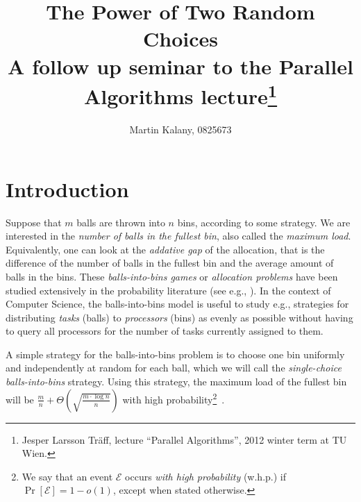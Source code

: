 \documentclass[a4paper,12pt]{article}
\begin{document}
\title{The Power of Two Random Choices\\ 
\large A follow up seminar to the Parallel Algorithms lecture\footnote{Jesper Larsson Träff, lecture ``Parallel Algorithms'', 2012 winter term at TU Wien.}}
\author{Martin Kalany, 0825673}

\maketitle
\begin{abstract}

\end{abstract}


\section{Introduction}
\label{sec:intro}
Suppose that $m$ balls are thrown into $n$ bins, according to some strategy. We are interested in the \emph{number of balls in the fullest bin}, also called the \emph{maximum load}. Equivalently, one can look at the \emph{addative gap} of the allocation, that is the difference of the number of balls in the fullest bin and the average amount of balls in the bins. These \emph{balls-into-bins games} or \emph{allocation problems} have been studied extensively in the probability literature (see e.g., \cite{JK77}). In the context of Computer Science, the balls-into-bins model is useful to study e.g., strategies for distributing \emph{tasks} (balls) to \emph{processors} (bins) as evenly as possible without having to query all processors for the number of tasks currently assigned to them.

A simple strategy for the balls-into-bins problem is to choose one bin uniformly and independently at random for each ball, which we will call the \emph{single-choice balls-into-bins} strategy. Using this strategy, the maximum load of the fullest bin will be $\frac{m}{n} + \Theta\left(\sqrt{\frac{m \cdot \log n}{n}}\right)$ with high probability\footnote{We say that an event $\mathcal E$ occurs \emph{with high probability} (w.h.p.) if $\Pr\left[\mathcal E \right] = 1 - o(1)$, except when stated otherwise.}~\cite{RS98}.
\end{document}
